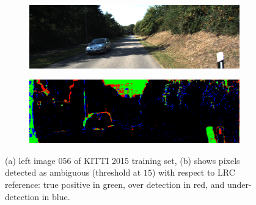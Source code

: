 \documentclass{article}
\begin{document}

\begin{figure}
\centering        
        \begin{subfigure}[t]{0.98\linewidth}
                \includegraphics[width=0.99\linewidth]{Figures/56}
                \caption{}
        \end{subfigure}
        \begin{subfigure}[t]{0.98\linewidth}
                \includegraphics[width=0.99\linewidth]{Figures/Occ_56}
                \caption{}
        \end{subfigure}  
        \caption{(a) left image 056 of KITTI 2015 training set, (b) shows pixels detected as ambiguous (threshold at $15$) with respect to LRC reference: true positive in green, over detection in red, and under-detection in blue.}
\label{fig:occ} 
\end{figure}
\end{document}
